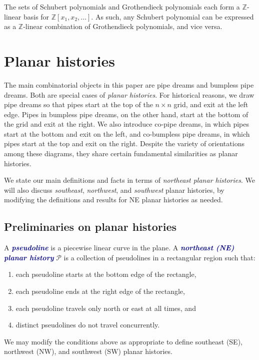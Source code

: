 \documentclass[12 pt]{amsart}
\newcommand{\newword}[1]{\textcolor{darkblue}{\textbf{\emph{#1}}}}
\numberwithin{equation}{section}
\theoremstyle{remark}
\begin{document}
	The sets of Schubert polynomials and Grothendieck polynomials each form a $\mathbb Z$-linear basis for $\mathbb Z[x_1,x_2,\ldots]$. 
	As such, any Schubert polynomial can be expressed as a \(\mathbb{Z}\)-linear combination of Grothendieck polynomials, and vice versa.
	

	
	\section{Planar histories}
	\label{section:planar}
	
	The main combinatorial objects in this paper are pipe dreams and bumpless pipe dreams. Both are special cases of \emph{planar histories}. 
	For historical reasons, we draw pipe dreams so that pipes start at the top of the $n \times n$ grid, and exit at the left edge. 
	Pipes in bumpless pipe dreams, on the other hand, start at the bottom of the grid and exit at the right. 
	We also introduce co-pipe dreams, in which pipes start at the bottom and exit on the left, and co-bumpless pipe dreams, in which pipes start at the top and exit on the right.
	Despite the variety of orientations among these diagrams, they share certain fundamental similarities as planar histories.
	
	We state our main definitions and facts in terms of \emph{northeast planar histories}. We will also discuss \emph{southeast}, \emph{northwest}, and \emph{southwest} planar histories, by modifying the definitions and results for NE planar histories as needed.
	
	\subsection{Preliminaries on planar histories}
	
	A \newword{pseudoline} is a piecewise linear curve in the plane.
	A \newword{northeast (NE) planar history} $\mathcal{P}$ is a collection of pseudolines in a rectangular region such that:
	\begin{enumerate}
		\item each pseudoline starts at the bottom edge of the rectangle,
		\item each pseudoline ends at the right edge of the rectangle,
		\item each pseudoline travels only north or east at all times, and
		\item distinct pseudolines do not travel concurrently.
	\end{enumerate}
	We may modify the conditions above as appropriate to define southeast (SE), northwest (NW), and southwest (SW) planar histories. 
	
\end{document}
